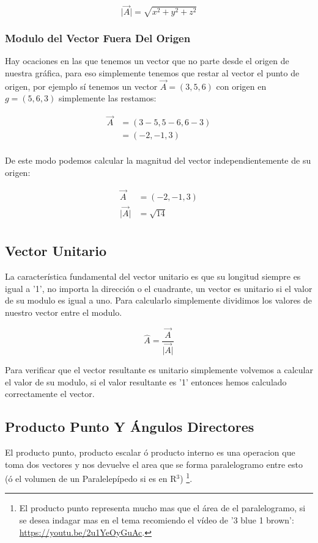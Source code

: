 \documentclass{article}
\begin{document}
\[
\vert\vec{A}\vert = \sqrt{ x^2 + y^2 + z^2 }
\]

\subsubsection*{Modulo del Vector Fuera Del Origen}
\label{sec:orga906b88}
Hay ocaciones en las que tenemos un vector que no parte desde el origen de nuestra gráfica, para eso simplemente tenemos que restar al vector el punto de origen, por ejemplo sí tenemos un vector \(\vec{A} = (3,5,6)\) con origen en \(g = (5,6,3)\) simplemente las restamos:

\[ \begin{aligned}
\vec{A} &= (3-5,5-6,6-3) \\
~ &= (-2,-1,3) \\
\end{aligned} \]

De este modo podemos calcular la magnitud del vector independientemente de su origen:

\[ \begin{aligned}
\vec{A} &= (-2,-1,3) \\
\vert\vec{A}\vert &= \sqrt{14} \\
\end{aligned} \]

\subsection{Vector Unitario}
\label{sec:org9cf7ab0}
La característica fundamental del vector unitario es que su longitud siempre es igual a '1', no importa la dirección o el cuadrante, un vector es unitario si el valor de su modulo es igual a uno. Para calcularlo simplemente dividimos los valores de nuestro vector entre el modulo.

\[ 
\hat{A} = \frac{\vec{A}}{\vert\vec{A}\vert} 
\]

Para verificar que el vector resultante es unitario simplemente volvemos a calcular el valor de su modulo, si el valor resultante es '1' entonces hemos calculado correctamente el vector.

\subsection{Producto Punto Y Ángulos Directores}
\label{sec:orgd14573b}
El producto punto, producto escalar ó producto interno es una operacion que toma dos vectores y nos devuelve el area que se forma paralelogramo entre esto (ó el volumen de un Paralelepípedo si es en R\(^{\text{3}}\)) \footnote{El producto punto representa mucho mas que el área de el paralelogramo, si se desea indagar mas en el tema recomiendo el vídeo de '3 blue 1 brown': \url{https://youtu.be/2u1YeOyGuAc}.}.
\end{document}
